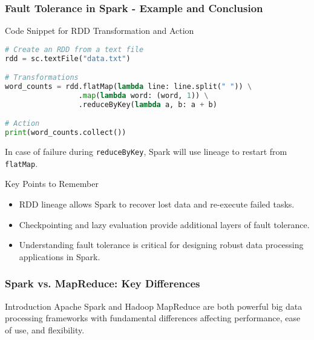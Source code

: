 \documentclass[aspectratio=169]{beamer}
\begin{document}
\begin{frame}[fragile]
    \frametitle{Fault Tolerance in Spark - Example and Conclusion}
    \begin{block}{Code Snippet for RDD Transformation and Action}
        \begin{lstlisting}[language=Python]
# Create an RDD from a text file
rdd = sc.textFile("data.txt")

# Transformations
word_counts = rdd.flatMap(lambda line: line.split(" ")) \
                 .map(lambda word: (word, 1)) \
                 .reduceByKey(lambda a, b: a + b)

# Action
print(word_counts.collect())
        \end{lstlisting}
        In case of failure during \texttt{reduceByKey}, Spark will use lineage to restart from \texttt{flatMap}.
    \end{block}
    
    \begin{block}{Key Points to Remember}
        \begin{itemize}
            \item RDD lineage allows Spark to recover lost data and re-execute failed tasks.
            \item Checkpointing and lazy evaluation provide additional layers of fault tolerance.
            \item Understanding fault tolerance is critical for designing robust data processing applications in Spark.
        \end{itemize}
    \end{block}
\end{frame}

\begin{frame}[fragile]
    \frametitle{Spark vs. MapReduce: Key Differences}
    \begin{block}{Introduction}
        Apache Spark and Hadoop MapReduce are both powerful big data processing frameworks with fundamental differences affecting performance, ease of use, and flexibility.
    \end{block}
\end{frame}
\end{document}
